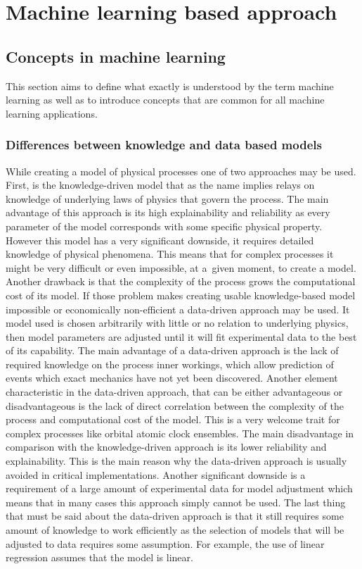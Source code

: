 \chapter{Machine learning based approach}


\FloatBarrier
\section{Concepts in machine learning}
This section aims to define what exactly is understood by the term machine learning as well
as to introduce concepts that are common for all machine learning applications.

\FloatBarrier
\subsection{Differences between knowledge and data based models}
While creating a model of physical processes one of two approaches may be used.
First, is the knowledge-driven model that as the name implies relays on knowledge of underlying
laws of physics that govern the process.
The main advantage of this approach is its high explainability and reliability as every parameter
of the model corresponds with some specific physical property.
However this model has a very significant downside, it requires detailed knowledge of physical
phenomena. This means that for complex processes it might be very difficult or even
impossible, at a~given moment, to create a model. Another drawback is that the complexity of
the process grows the computational cost of its model.
If those problem makes creating usable knowledge-based model impossible or economically
non-efficient a data-driven approach may be used.
It model used is chosen arbitrarily with little or no relation to underlying physics,
then model parameters are adjusted until it will fit experimental data to the best of its
capability.
The main advantage of a data-driven approach is the lack of required knowledge on the process
inner workings, which allow prediction of events which exact mechanics have not
yet been discovered.
Another element characteristic in the data-driven approach, that can be either advantageous or
disadvantageous is the lack of direct correlation between the complexity
of the process and computational cost of the model.
This is a very welcome trait for complex processes like orbital atomic clock ensembles.
The main disadvantage in comparison with the knowledge-driven approach is its 
lower reliability and explainability. 
This is the main reason why the data-driven approach is usually avoided in
critical implementations. Another significant downside is a requirement of a large amount of
experimental data for model adjustment which means that in many cases this approach simply
cannot be used.
The last thing that must be said about the data-driven approach is that it still requires some
amount of knowledge to work efficiently as the selection of models that will be adjusted to
data requires some assumption. For example, the use of linear regression assumes that the model
is linear.

